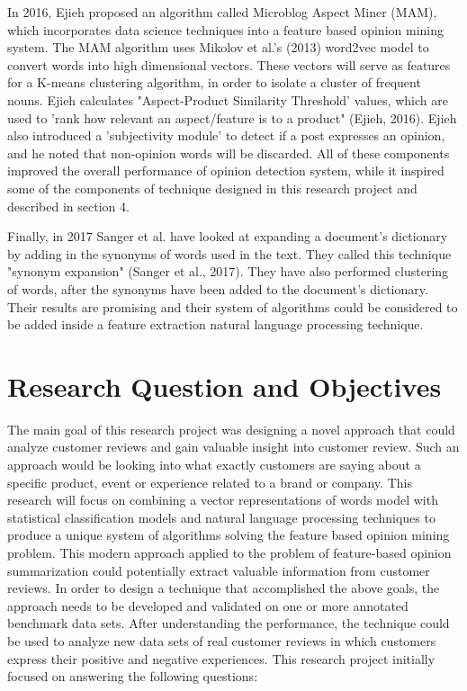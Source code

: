 \documentclass{sig-alternate}
\begin{document}
In 2016, Ejieh proposed an algorithm called Microblog Aspect Miner (MAM), which incorporates data science techniques into a feature based opinion mining system. The MAM algorithm uses Mikolov et al.'s (2013) word2vec model to convert words into high dimensional vectors. These vectors will serve as features for a K-means clustering algorithm, in order to isolate a cluster of frequent nouns. Ejieh calculates "Aspect-Product Similarity Threshold' values, which are used to 'rank how relevant an aspect/feature is to a product" (Ejieh, 2016). Ejieh also introduced a 'subjectivity module' to detect if a post expresses an opinion, and he noted that non-opinion words will be discarded. All of these components improved the overall performance of opinion detection system, while it inspired some of the components of technique designed in this research project and described in section 4. 

Finally, in 2017 Sanger et al. have looked at expanding a document's dictionary by adding in the synonyms of words used in the text. They called this technique "synonym expansion" (Sanger et al., 2017). They have also performed clustering of words, after the synonyms have been added to the document's dictionary. Their results are promising and their system of algorithms could be considered to be added inside a feature extraction natural language processing technique.

\section{Research Question and Objectives}
The main goal of this research project was designing a novel approach that could analyze customer reviews and gain valuable insight into customer review. Such an approach would be looking into what exactly customers are saying about a specific product, event or experience related to a brand or company. This research will focus on combining a vector representations of words model with statistical classification models and natural language processing techniques  to produce a unique system of algorithms solving the feature based opinion mining problem. This modern approach applied to the problem of feature-based opinion summarization could potentially extract valuable information from customer reviews.
In order to design a technique that accomplished the above goals, the approach needs to be developed and validated on one or more annotated benchmark data sets. After understanding the performance, the technique could be used to analyze new data sets of real customer reviews in which customers express their positive and negative experiences. This research project initially focused on answering the following questions: 
\end{document}
